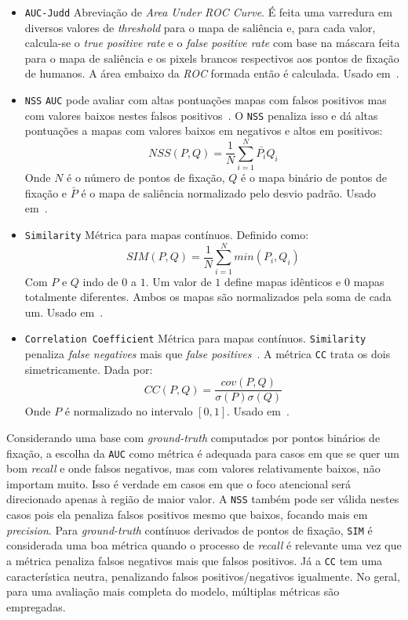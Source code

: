 \documentclass[11pt]{article}
\newcommand{\tit}[1]{\textit{#1}}
\newcommand{\ttt}[1]{\texttt{#1}}
\begin{document}
\begin{itemize}
	\item \ttt{AUC-Judd}\newline
	Abreviação de \tit{Area Under ROC Curve}. É feita uma varredura em diversos
	valores de \tit{threshold} para o mapa de saliência e, para cada valor,
	calcula-se o \tit{true positive rate} e o \tit{false positive rate} com
	base na máscara feita para o mapa de saliência e os pixels brancos
	respectivos aos pontos de fixação de humanos.
	A área embaixo da \tit{ROC} formada então é calculada.
	Usado em~\cite{mit-300, juddBM}.

	\item \ttt{NSS}\newline
	\ttt{AUC} pode avaliar com altas pontuações mapas com falsos positivos
	mas com valores baixos nestes falsos positivos~\cite{judd2}.
	O \ttt{NSS} penaliza isso e dá altas pontuações a mapas com valores
	baixos em negativos e altos em positivos:
	$$NSS(P, Q) = \frac{1}{N}\sum\limits_{i=1}^N{\bar{P_{i}}Q_{i}}$$
	Onde $N$ é o número de pontos de fixação,
	$Q$ é o mapa binário de pontos de fixação e $\bar{P}$ é o mapa de
	saliência normalizado pelo desvio padrão.
	Usado em~\cite{mit-300}.

	\item \ttt{Similarity}\newline
	Métrica para mapas contínuos. Definido como:
	$$SIM(P, Q) = \frac{1}{N}\sum\limits_{i=1}^N{min(P_i, Q_i)}$$
	Com $P$ e $Q$ indo de $0$ a $1$. Um valor de $1$ define mapas idênticos
	e $0$ mapas totalmente diferentes.
	Ambos os mapas são normalizados pela soma de cada um.
	Usado em~\cite{mit-300}.

	\item \ttt{Correlation Coefficient}\newline
	Métrica para mapas contínuos.
	\ttt{Similarity} penaliza \tit{false negatives} mais que
	\tit{false positives}~\cite{judd2}. A métrica \ttt{CC} trata os dois
	simetricamente. Dada por:
	$$CC(P, Q) = \frac{cov(P,Q)}{\sigma(P)\sigma(Q)}$$
	Onde $P$ é normalizado no intervalo $[0, 1]$.
	Usado em~\cite{mit-300}.
\end{itemize}

Considerando uma base com \tit{ground-truth} computados por pontos binários de fixação, a escolha da \ttt{AUC} como métrica é adequada para casos em que se quer um bom \tit{recall} e onde falsos negativos, mas com valores relativamente baixos,
não importam muito. Isso é verdade em casos em que o foco atencional será
direcionado apenas à região de maior valor.
A \ttt{NSS} também pode ser válida nestes casos pois ela penaliza falsos positivos mesmo
que baixos, focando mais em \tit{precision}.
Para \tit{ground-truth} contínuos derivados de pontos de fixação,
\ttt{SIM} é considerada uma boa métrica quando o processo de \tit{recall} é relevante uma vez que a métrica penaliza falsos negativos mais que falsos positivos. Já a \ttt{CC} tem uma característica neutra, penalizando falsos positivos/negativos igualmente. No geral, para uma avaliação mais completa do modelo, múltiplas métricas são empregadas.
\end{document}
